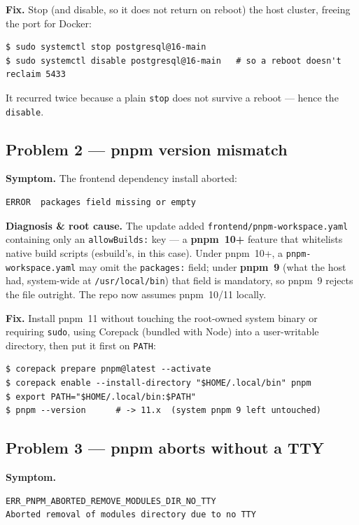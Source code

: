\documentclass[11pt,a4paper]{article}
\newcommand{\code}[1]{\texttt{\small #1}}
\begin{document}
\textbf{Fix.} Stop (and disable, so it does not return on reboot) the host
cluster, freeing the port for Docker:
\begin{lstlisting}
$ sudo systemctl stop postgresql@16-main
$ sudo systemctl disable postgresql@16-main   # so a reboot doesn't reclaim 5433
\end{lstlisting}
It recurred twice because a plain \code{stop} does not survive a reboot ---
hence the \code{disable}.

\subsection{Problem 2 --- pnpm version mismatch}

\textbf{Symptom.} The frontend dependency install aborted:
\begin{lstlisting}
ERROR  packages field missing or empty
\end{lstlisting}

\textbf{Diagnosis \& root cause.} The update added
\code{frontend/pnpm-workspace.yaml} containing only an \code{allowBuilds:} key ---
a \textbf{pnpm~10+} feature that whitelists native build scripts (esbuild's, in
this case). Under pnpm~10+, a \code{pnpm-workspace.yaml} may omit the
\code{packages:} field; under \textbf{pnpm~9} (what the host had, system-wide at
\code{/usr/local/bin}) that field is mandatory, so pnpm~9 rejects the file
outright. The repo now assumes pnpm~10/11 locally.

\textbf{Fix.} Install pnpm~11 without touching the root-owned system binary or
requiring \code{sudo}, using Corepack (bundled with Node) into a user-writable
directory, then put it first on \code{PATH}:
\begin{lstlisting}
$ corepack prepare pnpm@latest --activate
$ corepack enable --install-directory "$HOME/.local/bin" pnpm
$ export PATH="$HOME/.local/bin:$PATH"
$ pnpm --version      # -> 11.x  (system pnpm 9 left untouched)
\end{lstlisting}

\subsection{Problem 3 --- pnpm aborts without a TTY}

\textbf{Symptom.}
\begin{lstlisting}
ERR_PNPM_ABORTED_REMOVE_MODULES_DIR_NO_TTY
Aborted removal of modules directory due to no TTY
\end{lstlisting}
\end{document}
